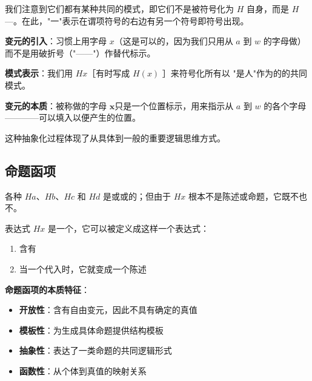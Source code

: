 \begin{examplebox}[title=模式识别与变元引入]
我们注意到它们都有某种共同的模式，即它们不是被符号化为 $H$ 自身，而是 $H$ —。在此，"一"表示在谓项符号的右边有另一个符号即符号出现。

\textbf{变元的引入}：习惯上用字母 $x$（这是可以的，因为我们只用从 $a$ 到 $w$ 的字母做）而不是用破折号（"——"）作替代标示。

\textbf{模式表示}：我们用 $H x$［有时写成 $H(x)$ ］来符号化所有以 "是人"作为的的共同模式。

\textbf{变元的本质}：被称做的字母 $\boldsymbol{x}$只是一个位置标示，用来指示从 $a$ 到 $w$ 的各个字母————可以填入以便产生的位置。

这种抽象化过程体现了从具体到一般的重要逻辑思维方式。
\end{examplebox}

\subsection{命题函项}

\begin{theorembox}[title=命题函项的精确定义]
各种 $H a 、 H b 、 H c$ 和 $H d$ 是或或的；但由于 $H x$ 根本不是陈述或命题，它既不也不。

表达式 $H x$ 是一个，它可以被定义成这样一个表达式：
\begin{enumerate}
\item 含有
\item 当一个代入时，它就变成一个陈述
\end{enumerate}

\textbf{命题函项的本质特征}：
\begin{itemize}
\item \textbf{开放性}：含有自由变元，因此不具有确定的真值
\item \textbf{模板性}：为生成具体命题提供结构模板
\item \textbf{抽象性}：表达了一类命题的共同逻辑形式
\item \textbf{函数性}：从个体到真值的映射关系
\end{itemize}
\end{theorembox}

